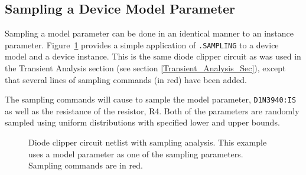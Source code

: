 \subsection{Sampling a Device Model Parameter}
\label{sampling_ModelParam}

Sampling a model parameter can be done in an identical manner to an instance parameter.  
Figure~\ref{Sampling_Netlist_2} provides a simple application of \verb|.SAMPLING| to a 
device model and a device instance.  This is the same diode clipper circuit as was used 
in the Transient Analysis section (see section \ref{Transient_Analysis_Sec}), except that 
several lines of sampling commands (in red) have been added.  

The sampling commands will cause \Xyce{} to sample the model parameter, \verb|D1N3940:IS| as well as the 
resistance of the resistor, R4. Both of the parameters are randomly sampled using uniform distributions 
with specified lower and upper bounds.
\begin{figure}[htbp]
\begin{centering}
\caption{Diode clipper circuit netlist with sampling analysis.  This example uses a model parameter as one of the sampling parameters.
Sampling commands are in \color{XyceRed}red\color{black}.
  \label{Sampling_Netlist_2}}
\end{centering}
\end{figure}

